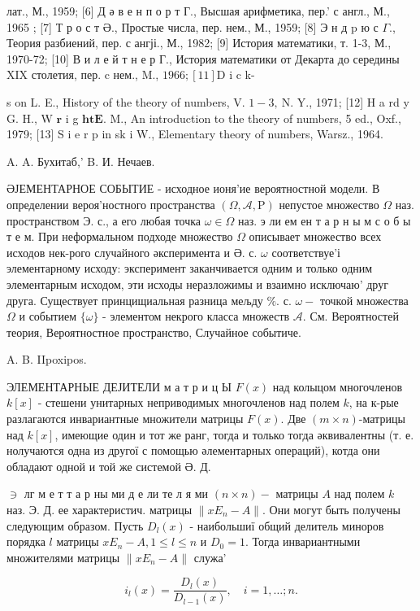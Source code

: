 \documentclass[10pt]{article}
\begin{document}
лат., М., 1959; [6] Д ә в е н п о р т Г., Высшая арифметика, пер.' с англ., М., 1965 ; [7] Т р о с т Ә., Простые числа, пер. нем., М., 1959; [8] Э н д p ю с $\Gamma$., Теория разбиений, пер. с ангјі., М., 1982; [9] История математики, т. 1-3, М., 1970-72; [10] В и л е й т н е р Г., История математики от Декарта до середины XIX столетия, пер. c нем., M., $1966 ;[11] \mathrm{D}$ i c k-

s on L. E., History of the theory of numbers, V. $1-3, \mathrm{~N}$. Y., 1971; [12] H a rd y G. H., W $\mathbf{r}$ i g $\mathbf{h} \mathbf{t} \mathbf{E}$. M., An introduction to the theory of numbers, 5 ed., Oxf., 1979; [13] S i e r p in s$\mathrm{k}$ i W., Elementary theory of numbers, Warsz., 1964.



A. A. Бухитаб,' B. И. Нечаев.



ӘЈЕМЕНТАРНОЕ СОБЫТИЕ - исходное ионя'ие вероятностной модели. В определении вероя'ностного пространства $(\Omega, \mathscr{A}, \mathrm{P})$ непустое множество $\Omega$ наз. пространством Э. с., а его любая точка $\omega \in \Omega$ наз. э ли ем ен т а р н ы м с о б ы т е м. При неформальном подходе множество $\Omega$ описывает множество всех исходов нек-рого случайного әксперимента и Ә. с. $\omega$ соответствуе'і элементарному исходу: эксперимент заканчивается одним и только одним элементарным исходом, эти исходы неразложимы и взаимно исключаю' друг друга. Существует принцищиальная разница мељду $\%$. с. $\omega-$ точкой множества $\Omega$ и событием $\{\omega\}$ - элементом некрого класса множеств $\mathscr{A}$. См. Вероятностей теория, Вероятностное пространство, Случайное событиче.



A. B. IIpoxipos.



ЭЛЕМЕНТАРНЫЕ ДЕЈИТЕЛИ м а т р и ц Ы $F(x)$ над колыцом многочленов $k[x]$ - стешени унитарных неприводимых многочленов над полем $k$, на к-рые разлагаются инвариантные множители матрицы $F(x)$. Две $(m \times n)$-матрицы над $k[x]$, имеющие один и тот же ранг, тогда и только тогда әквивалентны (т. е. нолучаются одна из другої с помощью әлементарных операций), котда они обладают одной и той же системой Ә. Д.



$\ni$ лг м е т т а р ны ми д е ли те л я ми $(n \times n)-$ матрицы $A$ над полем $k$ наз. Э. Д. ее характеристич. матрицы $\left\|x E_{n}-A\right\|$. Они могут быть получены следующим образом. Пусть $D_{l}(x)$ - наибольшиї общий делитель миноров порядка $l$ матрицы $x E_{n}-A, 1 \leqslant l \leqslant n$ и $D_{0}=1$. Тогда инвариантными множителями матрицы $\left\|x E_{n}-A\right\|$ служа'



\[

i_{l}(x)=\frac{D_{l}(x)}{D_{l-1}(x)}, \quad i=1, \ldots ; n .

\]
\end{document}
